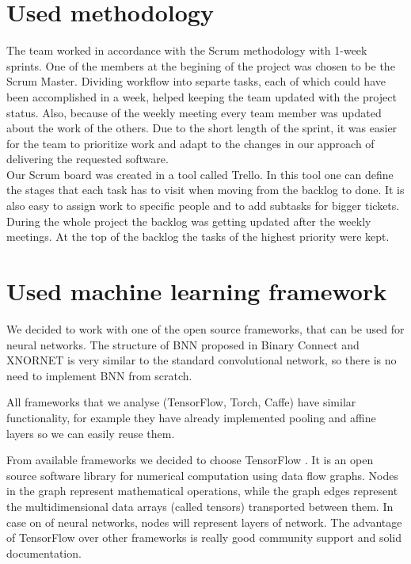 \documentclass[licencjacka]{pracamgr}
\begin{document}
	\section{Used methodology}

	The team worked in accordance with the Scrum methodology with 1-week sprints. One of the members at the begining of the project was chosen to be the Scrum Master. Dividing workflow into separte tasks, each of which could have been accomplished in a week, helped keeping the team updated with the project status. Also, because of the weekly meeting every team member was updated about the work of the others. Due to the short length of the sprint, it was easier for the team to prioritize work and adapt to the changes in our approach of delivering the requested software.
\\
	Our Scrum board was created in a tool called Trello. In this tool one can define the stages that each task has to visit when moving from the backlog to done. It is also easy to assign work to specific people and to add subtasks for bigger tickets. During the whole project the backlog was getting updated after the weekly meetings. At the top of the backlog the tasks of the highest priority were kept.

	\section{Used machine learning framework}

		We decided to work with one of the open source frameworks, that can be used for neural networks. The structure of BNN proposed in Binary Connect \cite{binaryConnect} and XNORNET \cite{xnornet} is very similar to the standard convolutional network, so there is no need to implement BNN from scratch. 
	
		All frameworks that we analyse (TensorFlow, Torch, Caffe) have similar functionality, for example they have already implemented pooling and affine layers so we can easily reuse them. 

		From available frameworks we decided to choose TensorFlow \cite{tensorFlow}. It is an open source software library for numerical computation using data flow graphs. Nodes in the graph represent mathematical operations, while the graph edges represent the multidimensional data arrays (called tensors) transported between them. In case on of neural networks, nodes will represent layers of network. 
		The advantage of TensorFlow over other frameworks is really good community support and solid documentation.
\end{document}
